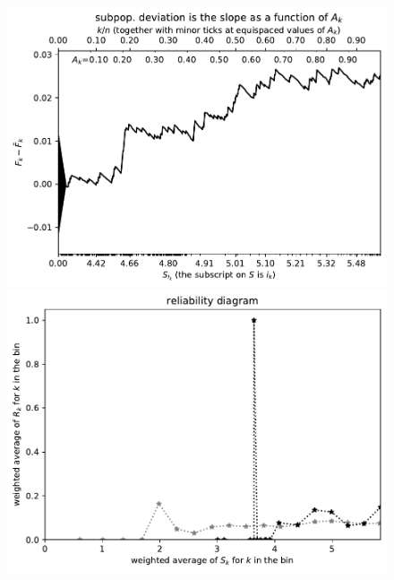 \documentclass{article}
\begin{document}
\begin{figure}
\begin{centering}

\parbox{\imsize}{\includegraphics[width=\imsize]
{./codes/weighted/County_of_Napa-SATELLITE/cumulative}}
\quad\quad
\parbox{\imsize}{\includegraphics[width=\imsize]
{./codes/weighted/County_of_Napa-SATELLITE/equiscores20}}

\vspace{\vertsep}


\end{centering}
\end{figure}
\end{document}
